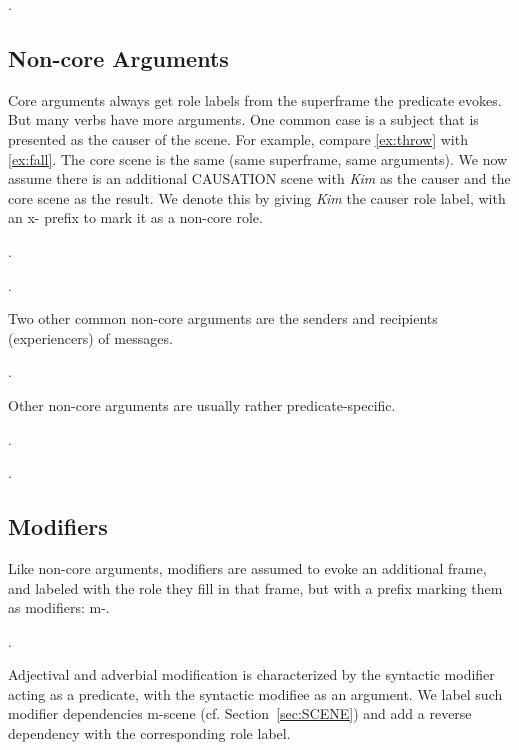 \documentclass[a4paper]{article}
\newcommand{\fr}[1]{\textsf{#1}}
\newcommand{\rl}[1]{\textsf{#1}}
\begin{document}
\ex.


\newpage\subsection{Non-core Arguments}

Core arguments always get role labels from the superframe the predicate evokes.
But many verbs have more arguments. One common case is a subject that is
presented as the causer of the scene. For example, compare \ref{ex:throw} with
\ref{ex:fall}. The core scene is the same (same superframe, same arguments). We
now assume there is an additional \fr{CAUSATION} scene with \emph{Kim} as the
\rl{causer} and the core scene as the \rl{result}. We denote this by giving
\emph{Kim} the \rl{causer} role label, with an \rl{x-} prefix to mark it as a
non-core role.

\ex.\label{ex:throw}

\ex.

Two other common non-core arguments are the senders and recipients (experiencers) of messages.

\ex.

Other non-core arguments are usually rather predicate-specific.

\ex.

\ex.


\newpage\subsection{Modifiers}

Like non-core arguments, modifiers are assumed to evoke an additional frame,
and labeled with the role they fill in that frame, but with a prefix marking
them as modifiers: \rl{m-}.

\ex.

Adjectival and adverbial modification is characterized by the syntactic
modifier acting as a predicate, with the syntactic modifiee as an argument.  We
label such modifier dependencies \rl{m-scene} (cf. Section~\ref{sec:SCENE}) and
add a reverse dependency with the corresponding role label.
\end{document}
